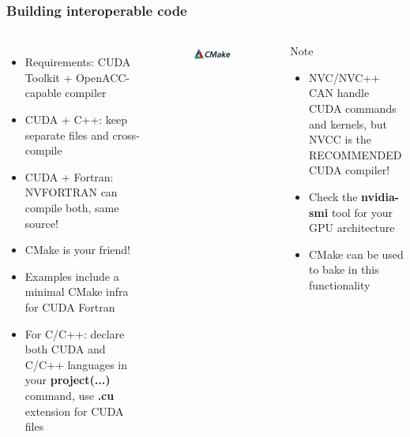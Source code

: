 \begin{frame}
	\frametitle{Building interoperable code}
	\begin{columns}
		\begin{itemize}
			\item Requirements: CUDA Toolkit + OpenACC-capable compiler
			\item CUDA + C++: keep separate files and cross-compile
			\item CUDA + Fortran: NVFORTRAN can compile both, same source!
			\item CMake is your friend!
			\item Examples include a minimal CMake infra for CUDA Fortran
			\item For C/C++: declare both CUDA and C/C++ languages in your \textbf{project(...)} command, use \textbf{.cu} extension for CUDA files
		\end{itemize}
		\begin{figure}
			\centering
			\includegraphics[width=0.8\textwidth]{images/cmake-logo.png}
		\end{figure}
		\begin{alertblock}{Note}
			\begin{itemize}
				\item NVC/NVC++ CAN handle CUDA commands and kernels, but NVCC is the RECOMMENDED CUDA compiler!
				\item Check the \textbf{nvidia-smi} tool for your GPU architecture
				\item CMake  can be used to bake in this functionality
			\end{itemize}
		\end{alertblock}
	\end{columns}
\end{frame}

